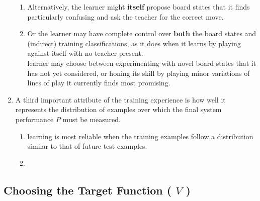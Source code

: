 \begin{enumerate}[itemsep=0.2cm]
\begin{enumerate}
        \item Alternatively, the learner might \textbf{itself} propose board states that it finds particularly confusing and ask the teacher for the correct move.
        \hfill \cite{ml/book/Machine-Learning/Tom-M-Mitchell}

        \item Or the learner may have complete control over \textbf{both} the board states and (indirect) training classifications, as it does when it learns by playing against itself with no teacher present.
        \hfill \cite{ml/book/Machine-Learning/Tom-M-Mitchell}
        \\
        learner may choose between experimenting with novel board states that it has not yet considered, or honing its skill by playing minor variations of lines of play it currently finds most promising.
        \hfill \cite{ml/book/Machine-Learning/Tom-M-Mitchell}
    \end{enumerate}

    \item A third important attribute of the training experience is how well it represents the distribution of examples over which the final system performance $P$ must be measured.
    \hfill \cite{ml/book/Machine-Learning/Tom-M-Mitchell}
    \begin{enumerate}
        \item learning is most reliable when the training examples follow a distribution similar to that of future test examples.
        \hfill \cite{ml/book/Machine-Learning/Tom-M-Mitchell}

        \item 
        \hfill \cite{ml/book/Machine-Learning/Tom-M-Mitchell}
    \end{enumerate}
\end{enumerate}




\subsection{Choosing the Target Function ( $V$ ) }

